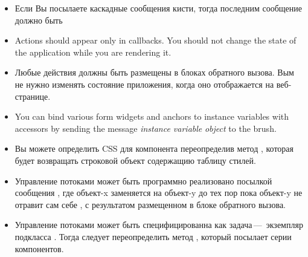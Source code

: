 \documentclass[a4paper,10pt,twoside]{book}
\begin{document}
\begin{itemize}
\item Если Вы посылаете каскадные сообщения кисти, тогда последним
сообщение должно быть 
\item Actions should appear only in callbacks.
You should not change the state of the application while you are rendering it.
\item Любые действия должны быть размещены в блоках обратного вызова.
Вым не нужно изменять состояние приложения, когда оно отображается на
веб-странице.
\item You can bind various form widgets and anchors to instance variables with accessors
by sending the message  \emph{instance variable}  \emph{object} to the
brush.
\item Вы можете определить CSS для компонента переопределив метод
, которая будет возвращать строковой объект содержащию таблицу
стилей.
\item Управление потоками может быть программно реализовано посылкой
сообщения , где объект-x заменяется на объект-y до тех пор
пока объект-y не отравит сам себе , с результатом
размещенном в блоке обратного вызова.
\item Управление потоками может быть специфицированна как задача\,---\,
экземпляр подкласса . Тогда следует переопределить метод
, который посылает  серии компонентов.

\end{itemize}
\end{document}
